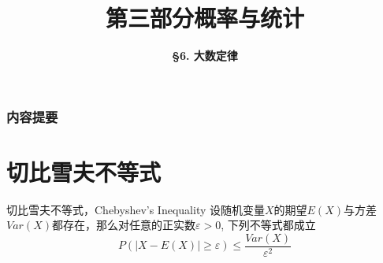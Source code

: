 



\title[Probability \& Statistics]{\LARGE \bfseries 第三部分\quad 概率与统计} %
\author[Law of Large Numbers] %
{\Large \bfseries \S 6. 大数定律}
\date{}






\begin{frame}

\titlepage %

\end{frame}


\begin{frame}
\frametitle{内容提要} %
\tableofcontents %
\end{frame}


\section{切比雪夫不等式}


\begin{frame}

\begin{block}{切比雪夫不等式，Chebyshev's Inequality}
设随机变量$X$的期望$E(X)$与方差$Var(X)$都存在，那么对任意的正实数$\varepsilon > 0$, 下列不等式都成立
\[P(\vert X - E(X) \vert \ge \varepsilon) \le \dfrac{Var(X)}{\varepsilon^2}\]
\end{block}

\end{frame}

